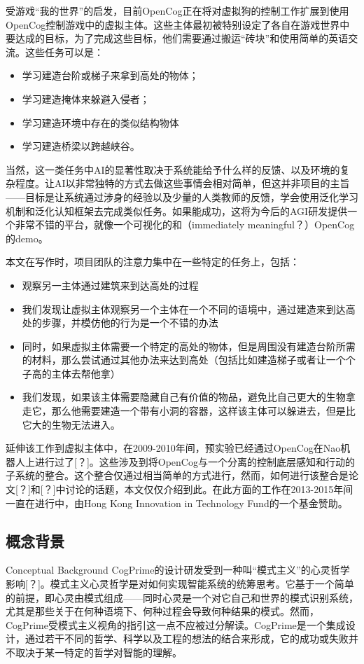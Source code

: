 受游戏“我的世界”的启发，目前OpenCog正在将对虚拟狗的控制工作扩展到使用OpenCog控制游戏中的虚拟主体。这些主体最初被特别设定了各自在游戏世界中要达成的目标，为了完成这些目标，他们需要通过搬运“砖块”和使用简单的英语交流。这些任务可以是：

\begin{itemize}
\item 学习建造台阶或梯子来拿到高处的物体；
\item 学习建造掩体来躲避入侵者；
\item 学习建造环境中存在的类似结构物体
\item 学习建造桥梁以跨越峡谷。
\end{itemize}

当然，这一类任务中AI的显著性取决于系统能给予什么样的反馈、以及环境的复杂程度。让AI以非常独特的方式去做这些事情会相对简单，但这并非项目的主旨——目标是让系统通过涉身的经验以及少量的人类教师的反馈，学会使用泛化学习机制和泛化认知框架去完成类似任务。如果能成功，这将为今后的AGI研发提供一个非常不错的平台，就像一个可视化的和（immediately meaningful？）OpenCog的demo。

本文在写作时，项目团队的注意力集中在一些特定的任务上，包括：
\begin{itemize}
\item 观察另一主体通过建筑来到达高处的过程
\item 我们发现让虚拟主体观察另一个主体在一个不同的语境中，通过建造来到达高处的步骤，并模仿他的行为是一个不错的办法
\item 同时，如果虚拟主体需要一个特定的高处的物体，但是周围没有建造台阶所需的材料，那么尝试通过其他办法来达到高处（包括比如建造梯子或者让一个个子高的主体去帮他拿）
\item 我们发现，如果该主体需要隐藏自己有价值的物品，避免比自己更大的生物拿走它，那么他需要建造一个带有小洞的容器，这样该主体可以躲进去，但是比它大的生物无法进入。
\end{itemize}

延伸该工作到虚拟主体中，在2009-2010年间，预实验已经通过OpenCog在Nao机器人上进行过了[？]。这些涉及到将OpenCog与一个分离的控制底层感知和行动的子系统的整合。这个整合仅通过相当简单的方式进行，然而，如何进行该整合是论文[？]和[？]中讨论的话题，本文仅仅介绍到此。在此方面的工作在2013-2015年间一直在进行中，由Hong Kong Innovation in Technology Fund的一个基金赞助。

\subsection{概念背景}{Conceptual Background}
\indent CogPrime的设计研发受到一种叫“模式主义”的心灵哲学影响[？]。模式主义心灵哲学是对如何实现智能系统的统筹思考。它基于一个简单的前提，即心灵由模式组成——同时心灵是一个对它自己和世界的模式识别系统，尤其是那些关于在何种语境下、何种过程会导致何种结果的模式。然而，CogPrime受模式主义视角的指引这一点不应被过分解读。CogPrime是一个集成设计，通过若干不同的哲学、科学以及工程的想法的结合来形成，它的成功或失败并不取决于某一特定的哲学对智能的理解。

